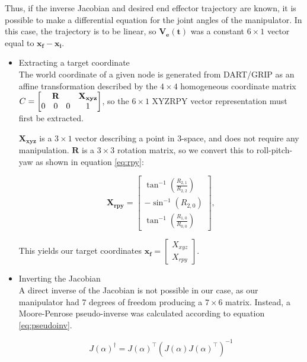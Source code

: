 \documentclass[10pt, conference]{IEEEtran}
\begin{document}
    Thus, if the inverse Jacobian and desired end effector trajectory
    are known, it is possible to make a differential equation for the
    joint angles of the manipulator. In this case, the trajectory is to
    be linear, so \(\mathbf{V_e(t)}\) was a constant \(6 \times 1\) vector equal
    to \(\mathbf{x_f}-\mathbf{x_i}\).
\begin{itemize}

\item Extracting a target coordinate\\
\label{sec-3-4-1-1}%
The world coordinate of a given node is generated from DART/GRIP as
     an affine transformation described by the \(4 \times 4\)
     homogeneous coordinate matrix \(C = \begin{bmatrix}
     \multicolumn{3}{c}{\mathbf{R}} & \mathbf{X_{xyz}} \\ 0 & 0 & 0 & 1 \end{bmatrix}\),
     so the \(6 \times 1\) XYZRPY vector representation must first be
     extracted.

     \(\mathbf{X_{xyz}}\) is a \(3 \times 1\) vector describing a point in
     3-space, and does not require any manipulation. \(\mathbf{R}\) is a \(3
     \times 3\) rotation matrix, so we convert this to roll-pitch-yaw as
     shown in equation \ref{eq:rpy}:

     \begin{equation}
     \label{eq:rpy}
     \mathbf{X_{rpy}} = \begin{bmatrix} \tan^{-1}(\frac{R_{2,1}}{R_{2,2}}) \\
     -\sin^{-1}(R_{2,0}) \\ \tan^{-1}(\frac{R_{1,0}}{R_{0,0}}) \end{bmatrix},
     \end{equation}

     This yields our target coordinates \(\mathbf{x_{f}}
     = \begin{bmatrix}X_{xyz} \\ X_{rpy} \end{bmatrix} \).


\item Inverting the Jacobian\\
\label{sec-3-4-1-2}%
A direct inverse of the Jacobian is not possible in our case, as
     our manipulator had 7 degrees of freedom producing a \(7 \times 6\)
     matrix. Instead, a Moore-Penrose pseudo-inverse was calculated
     according to equation \ref{eq:pseudoinv}.

     \begin{equation}
     \label{eq:pseudoinv}
     J(\alpha)^{\dagger} = J(\alpha)^{\top}(J(\alpha)J(\alpha)^{\top})^{-1}
     \end{equation}


\end{itemize}
\end{document}
